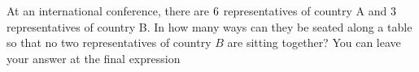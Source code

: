 
%
%
%
%      
% 
% 
%   



\gcalcexpr[0]
\gcalcexpr[0]
\gcalcexpr[0]
\gcalcexpr[0]

\question[5] At an international conference, there are $6$ representatives of country A and $3$ representatives 
of country B. In how many ways can they be seated along a table so that no two representatives of country $B$ 
are sitting together? You can leave your answer at the final expression

